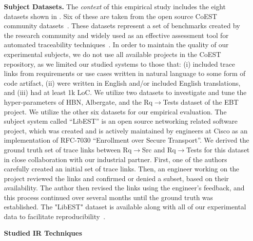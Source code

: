 \textbf{Subject Datasets.} The \textit{context} of this empirical study includes the eight datasets shown in . Six of these are taken from the open source CoEST community datasets~\cite{coest-datasets}. These datasets represent a set of benchmarks created by the research community and widely used as an effective assessment tool for automated traceability techniques~\citep{Antoniol:e,Cleland-Huang:TSE'03,Poshyvanyk:TEFSE'11,Gethers:ICSM'11}. In order to maintain the quality of our experimental subjects, we do not use all available projects in the CoEST repository, as we limited our studied systems to those that: (i) included trace links from requirements or use cases written in natural language to some form of code artifact, (ii) were written in English and/or included English translations, and (iii) had at least 1k LoC.  We utilize two datasets to investigate and tune the hyper-parameters of \Comets HBN, Albergate, and the Rq$\rightarrow$Tests dataset of the EBT project. We utilize the other six datasets for our empirical evaluation. The subject system called ``LibEST'' is an open source networking related software project, which was created and is actively maintained by engineers at Cisco as an implementation of RFC-7030 ``Enrollment over Secure Transport''. We derived the ground truth set of trace links between Rq$\rightarrow$Src and Rq$\rightarrow$Tests for this dataset in close collaboration with our industrial partner. First, one of the authors carefully created an initial set of trace links. Then, an engineer working on the project reviewed the links and confirmed or denied a subset, based on their availability. The author then revised the links using the engineer's feedback, and this process continued over several months until the ground truth was established. The "LibEST" dataset is available along with all of our experimental data to facilitate reproducibility~\citep{appendix}.


\textbf{Studied IR Techniques}

